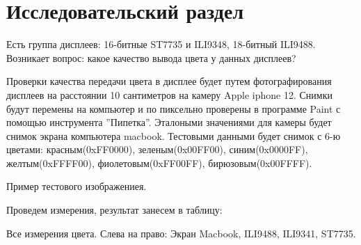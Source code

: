 \chapter{Исследовательский раздел}

	Есть группа дисплеев: 16-битные ST7735 и ILI9348, 18-битный ILI9488. Возникает вопрос: какое качество вывода цвета у данных дисплеев? %
	
	Проверки качества передачи цвета в дисплее будет путем фотографирования дисплеев на расстоянии 10 сантиметров на камеру Apple iphone 12. Снимки будут перемены на компьютер и по пиксельно проверены в программе Paint с помощью инструмента ''Пипетка''. Эталоными значениями для камеры будет снимок экрана компьютера macbook. Тестовыми данными будет снимок с 6-ю цветами: красным(0xFF0000), зеленым(0x00FF00), синим(0x0000FF), желтым(0xFFFF00), фиолетовым(0xFF00FF), бирюзовым(0x00FFFF).
	
	{Пример тестового изображениея.}
	
	Проведем измерения, результат занесем в таблицу:
	
	{Все измерения цвета. Слева на право: Экран Macbook, ILI9488, ILI9341, ST7735.}
	
